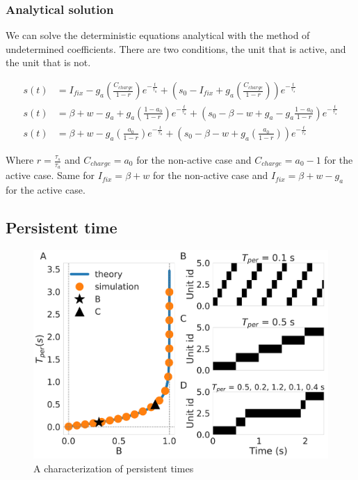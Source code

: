 \documentclass[10pt,a4paper]{article}
\begin{document}
\subsubsection{Analytical solution}
We can solve the deterministic equations analytical with the method of undetermined coefficients. There are two conditions, the unit that is active, and the unit that is not. 


\begin{align*} 
s(t) &= I_{fix} - g_a\left(\frac{C_{charge}}{1 - r} \right) e^{-\frac{t}{\tau_a}} + \left(s_0 - I_{fix} + g_a \left( \frac{C_{charge}}{1 - r}\right)\right)e^{-\frac{t}{\tau_s}} \\
s(t) &= \beta + w - g_a + g_a \left(\frac{1 - a_0}{1 - r}\right) e^{-\frac{t}{\tau_a}} + \left(s_0 - \beta - w + g_a - g_a \frac{1 - a_0}{1 - r}\right) e^{-\frac{t}{\tau_s}}  \\ 
s(t) &= \beta + w - g_a \left( \frac{a_0}{1 - r} \right) e^{-\frac{t}{\tau_a}} + \left(s_0 - \beta  - w  + g_a \left( \frac{a_0}{1 - r} \right) \right) e^{-\frac{t}{\tau_s}} 
\end{align*}

Where $r=\frac{\tau_s}{\tau_a}$ and $C_{charge}=a_0$ for the non-active case and $C_{charge} = a_0 - 1$ for the active case. Same for $I_{fix}=\beta + w$ for the non-active case and $I_{fix} = \beta + w - g_a$ for the active case. 

\subsection{Persistent time}
\begin{figure}[H]
\centering
\includegraphics[scale=0.25]{persistent_times.pdf}
\caption{A characterization of persistent times}
\label{fig:per_time}
\end{figure}
\end{document}
